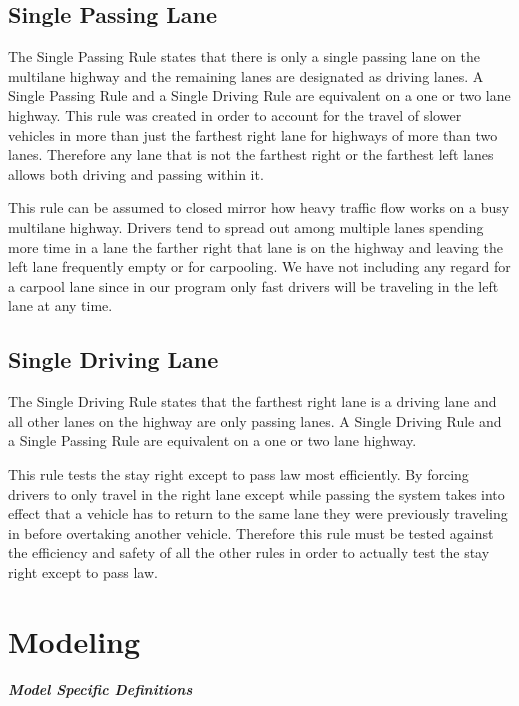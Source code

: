\documentclass{amsart}
\begin{document}
	\subsection{Single Passing Lane}
	The Single Passing Rule states that there is only a single passing lane on the multilane highway and the remaining lanes are designated as driving lanes.  A Single Passing Rule and a Single Driving Rule are equivalent on a one or two lane highway.  This rule was created in order to account for the travel of slower vehicles in more than just the farthest right lane for highways of more than two lanes.  Therefore any lane that is not the farthest right or the farthest left lanes allows both driving and passing within it. 
	
	This rule can be assumed to closed mirror how heavy traffic flow works on a busy multilane highway.  Drivers tend to spread out among multiple lanes spending more time in a lane the farther right that lane is on the highway and leaving the left lane frequently empty or for carpooling.  We have not including any regard for a carpool lane since in our program only fast drivers will be traveling in the left lane at any time.   
	
	\subsection{Single Driving Lane}
	The Single Driving Rule states that the farthest right lane is a driving lane and all other lanes on the highway are only passing lanes.  A Single Driving Rule and a Single Passing Rule are equivalent on a one or two lane highway.  

	This rule tests the stay right except to pass law most efficiently.  By forcing drivers to only travel in the right lane except while passing the system takes into effect that a vehicle has to return to the same lane they were previously traveling in before overtaking another vehicle. Therefore this rule must be tested against the efficiency and safety of all the other rules in order to actually test the stay right except to pass law.    

\section{\bfseries{Modeling}}

\textit{\textbf{Model Specific Definitions}}
\end{document}
